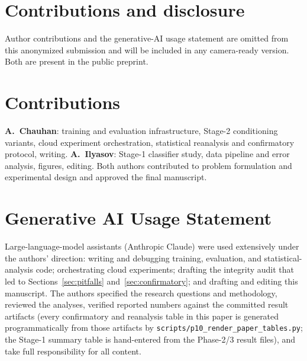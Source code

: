 \label{endofmaintext}
\ifworkshopbuild
\section*{Contributions and disclosure}
Author contributions and the generative-AI usage statement are omitted from
this anonymized submission and will be included in any camera-ready version.
Both are present in the public preprint.
\else
\section*{Contributions}
\textbf{A.~Chauhan}: training and evaluation infrastructure, Stage-2
conditioning variants, cloud experiment orchestration, statistical
reanalysis and confirmatory protocol, writing. \textbf{A.~Ilyasov}:
Stage-1 classifier study, data pipeline and error analysis, figures,
editing. Both authors contributed to problem formulation and experimental
design and approved the final manuscript.

\section*{Generative AI Usage Statement}
Large-language-model assistants (Anthropic Claude) were used extensively
under the authors' direction: writing and debugging training, evaluation,
and statistical-analysis code; orchestrating cloud experiments; drafting
the integrity audit that led to Sections~\ref{sec:pitfalls}
and~\ref{sec:confirmatory}; and drafting and editing this manuscript. The
authors specified the research questions and methodology, reviewed the
analyses, verified reported numbers against the committed result
artifacts (every confirmatory and reanalysis table in this paper is
generated programmatically from those artifacts by
\texttt{scripts/p10\_render\_paper\_tables.py}; the Stage-1 summary table
is hand-entered from the Phase-2/3 result files), and take full
responsibility for all content.
\fi
